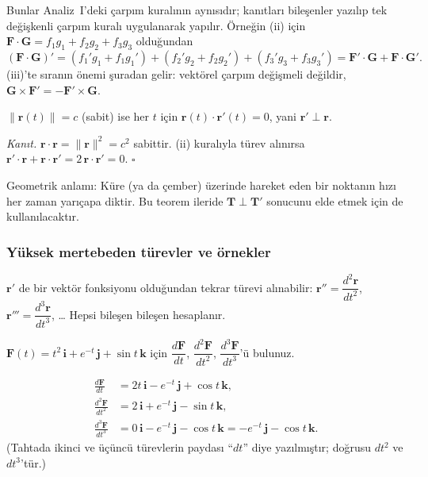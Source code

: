 Bunlar Analiz~I'deki çarpım kuralının aynısıdır; kanıtları bileşenler yazılıp tek değişkenli çarpım kuralı uygulanarak yapılır.
Örneğin (ii) için $\mathbf F\cdot\mathbf G=f_1g_1+f_2g_2+f_3g_3$ olduğundan
\[ (\mathbf F\cdot\mathbf G)'=(f_1'g_1+f_1g_1')+(f_2'g_2+f_2g_2')+(f_3'g_3+f_3g_3')=\mathbf F'\cdot\mathbf G+\mathbf F\cdot\mathbf G' . \]
(iii)'te sıranın önemi şuradan gelir: vektörel çarpım değişmeli değildir, $\mathbf G\times\mathbf F'=-\mathbf F'\times\mathbf G$.

\begin{teorem}
$\|\mathbf r(t)\|=c$ (sabit) ise her $t$ için $\mathbf r(t)\cdot\mathbf r'(t)=0$, yani $\mathbf r'\perp\mathbf r$.
\end{teorem}
\textit{Kanıt.} $\mathbf r\cdot\mathbf r=\|\mathbf r\|^2=c^2$ sabittir. (ii) kuralıyla türev alınırsa
$\mathbf r'\cdot\mathbf r+\mathbf r\cdot\mathbf r'=2\,\mathbf r\cdot\mathbf r'=0$. \hfill$\square$

Geometrik anlamı: Küre (ya da çember) üzerinde hareket eden bir noktanın hızı her zaman yarıçapa diktir. Bu teorem ileride
$\mathbf T\perp\mathbf T'$ sonucunu elde etmek için de kullanılacaktır.

\subsubsection{Yüksek mertebeden türevler ve örnekler}

$\mathbf r'$ de bir vektör fonksiyonu olduğundan tekrar türevi alınabilir:
$\mathbf r''=\dfrac{d^2\mathbf r}{dt^2}$, $\mathbf r'''=\dfrac{d^3\mathbf r}{dt^3}$, \dots{} Hepsi bileşen bileşen hesaplanır.

\begin{soru}
$\mathbf F(t)=t^2\,\mathbf i+e^{-t}\,\mathbf j+\sin t\,\mathbf k$ için $\dfrac{d\mathbf F}{dt}$, $\dfrac{d^2\mathbf F}{dt^2}$, $\dfrac{d^3\mathbf F}{dt^3}$'ü bulunuz.
\end{soru}
\begin{cevap}
\begin{align*}
\frac{d\mathbf F}{dt}&=2t\,\mathbf i-e^{-t}\,\mathbf j+\cos t\,\mathbf k,\\
\frac{d^2\mathbf F}{dt^2}&=2\,\mathbf i+e^{-t}\,\mathbf j-\sin t\,\mathbf k,\\
\frac{d^3\mathbf F}{dt^3}&=0\,\mathbf i-e^{-t}\,\mathbf j-\cos t\,\mathbf k=-e^{-t}\,\mathbf j-\cos t\,\mathbf k .
\end{align*}
(Tahtada ikinci ve üçüncü türevlerin paydası ``$dt$'' diye yazılmıştır; doğrusu $dt^2$ ve $dt^3$'tür.)
\end{cevap}

